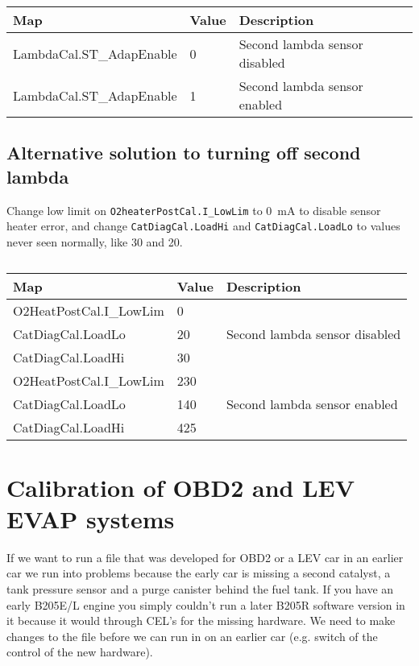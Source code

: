 \documentclass[11pt,a4paper]{book}
\begin{document}
\begin{table}
    \centering
    \begin{tabular}{lll}
        Map & Value& Description \\
        \midrule
        LambdaCal.ST\_AdapEnable & 0 &Second lambda sensor disabled \\
        LambdaCal.ST\_AdapEnable & 1& Second lambda sensor enabled \\
    \end{tabular}
    \caption{}
    \label{tab:}
\end{table}

\subsection{Alternative solution to turning off second lambda}
Change low limit on \texttt{O2heaterPostCal.I\_LowLim} to \SI{0}{\milli\ampere}
to disable sensor heater error, and change \texttt{CatDiagCal.LoadHi} and
\texttt{CatDiagCal.LoadLo} to values never seen normally, like 30 and 20.

\begin{table}
    \centering
    \begin{tabular}{lll}
        Map & Value & Description \\
        \midrule
        O2HeatPostCal.I\_LowLim& 0& \multirow{3}{*}{Second lambda sensor disabled} \\
        CatDiagCal.LoadLo &20 &\\
        CatDiagCal.LoadHi &30&\\
        O2HeatPostCal.I\_LowLim & 230 & \multirow{3}{*}{Second lambda sensor enabled}\\
        CatDiagCal.LoadLo &140 &\\
        CatDiagCal.LoadHi &425 &\\
    \end{tabular}
    \caption{}
    \label{tab:}
\end{table}

\section{Calibration of OBD2 and LEV EVAP systems}
If we want to run a file that was developed for OBD2 or a LEV car in an earlier
car we run into problems because the early car is missing a second catalyst, a
tank pressure sensor and a purge canister behind the fuel tank. If you have an
early B205E/L engine you simply couldn’t run a later B205R software version in
it because it would through CEL’s for the missing hardware. We need to make
changes to the file before we can run in on an earlier car (e.g. switch of the
    control of the new hardware).
\end{document}

